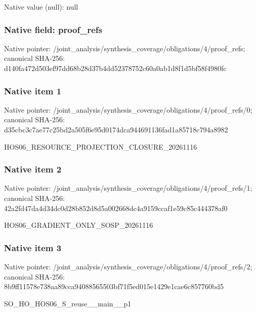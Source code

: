 \documentclass[10pt,a4paper]{article}
\begin{document}
Native value (null): null

\subsubsection{Native field: proof\_\allowbreak{}refs}
Native pointer: /joint\_\allowbreak{}analysis/synthesis\_\allowbreak{}coverage/obligations/4/proof\_\allowbreak{}refs; canonical SHA-256: d140fa472d503ef97dd68b28d37b4dd52378752c60a0ab1d8f1d5bf58f4980fc

\subsubsection{Native item 1}
Native pointer: /joint\_\allowbreak{}analysis/synthesis\_\allowbreak{}coverage/obligations/4/proof\_\allowbreak{}refs/0; canonical SHA-256: d35cbc3c7ae77c25bd2a505f6e95d0174dca944691136fad1a85718c794a8982

\begingroup\raggedright\sloppy HOS06\_\allowbreak{}RESOURCE\_\allowbreak{}PROJECTION\_\allowbreak{}CLOSURE\_\allowbreak{}20261116\par\endgroup

\subsubsection{Native item 2}
Native pointer: /joint\_\allowbreak{}analysis/synthesis\_\allowbreak{}coverage/obligations/4/proof\_\allowbreak{}refs/1; canonical SHA-256: 42a2fd47da4d34dc0d28b852d8d5a002668dc4a9159ccaf1e59c85c444378af0

\begingroup\raggedright\sloppy HOS06\_\allowbreak{}GRADIENT\_\allowbreak{}ONLY\_\allowbreak{}SOSP\_\allowbreak{}20261116\par\endgroup

\subsubsection{Native item 3}
Native pointer: /joint\_\allowbreak{}analysis/synthesis\_\allowbreak{}coverage/obligations/4/proof\_\allowbreak{}refs/2; canonical SHA-256: 8b9ff11578e738aa89cca94088565503bf71f5ed015e1429e1cae6c857760bd5

\begingroup\raggedright\sloppy SO\_\allowbreak{}HO\_\allowbreak{}HOS06\_\allowbreak{}S\_\allowbreak{}reuse\_\allowbreak{}\_\allowbreak{}main\_\allowbreak{}\_\allowbreak{}p1\par\endgroup
\end{document}
